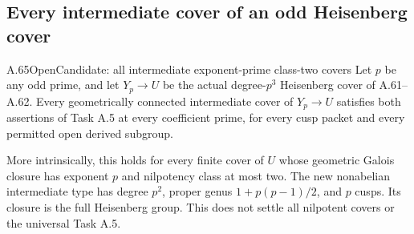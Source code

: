 \subsection{Every intermediate cover of an odd Heisenberg cover}

\begin{statement}{A.65}{Open}{Candidate: all intermediate exponent-prime class-two covers}
Let \(p\) be any odd prime, and let
\(Y_p\to U\) be the actual degree-\(p^3\)
Heisenberg cover of A.61--A.62. Every geometrically
connected intermediate cover of \(Y_p\to U\)
satisfies both assertions of Task A.5 at every
coefficient prime, for every cusp packet and every
permitted open derived subgroup.

More intrinsically, this holds for every finite cover
of \(U\) whose geometric Galois closure has exponent
\(p\) and nilpotency class at most two. The new
nonabelian intermediate type has degree \(p^2\),
proper genus \(1+p(p-1)/2\), and \(p\) cusps.
Its closure is the full Heisenberg group. This does
not settle all nilpotent covers or the universal
Task A.5.
\end{statement}

